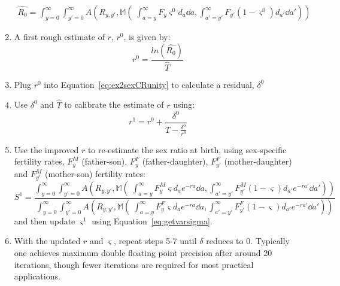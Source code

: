\begin{enumerate}
 \begin{equation}
 \begin{split}
 \widehat{R_0} = \int_{y=0}^\infty \int_{y'=0}^\infty
A\left(R_{y,y'},\mathbb{M}\left(\;\int_{a=y}^\infty F_y \varsigma^0 d_a \dd a,
\int _{a'=y'}^\infty F_{y'} (1-\varsigma^0) d_{a'} \dd a'\right)\right)
 \end{split}
 \end{equation}
  \item A first rough estimate of $r$, $r^0$, is given by:
   \begin{equation}
   r^0 = \frac{ln(\widehat{R_0})}{\widehat{T}}
   \end{equation}
  \item Plug $r^0$ into Equation~\ref{eq:ex2sexCRunity} to calculate a
  residual, $\delta^0$
  \item Use $\delta^0$ and $\widehat{T}$ to calibrate the estimate of $r$
  using:
  \begin{equation}
  r^{1} = r^0 + \frac{\delta^0}{\widehat{T} - \frac{\delta^0}{r^0}}
  \end{equation}
  \item Use the improved $r$ to re-estimate the sex ratio at birth, using
  sex-specific fertility rates, $F_y^M$ (father-son), $F_y^F$
  (father-daughter), $F_{y'}^F$ (mother-daughter) and $F_{y'}^M$ (mother-son)
  fertility rates:
  \begin{equation}
  S^1 = \frac{\int_{y=0}^\infty \int_{y'=0}^\infty
A\left(R_{y,y'},\mathbb{M}\left(\;\int_{a=y}^\infty F_y^M \varsigma d_ae^{-ra}
\dd a, \int _{a'=y'}^\infty F_{y'}^M (1-\varsigma) d_{a'}e^{-ra'} \dd
a'\right)\right)}{\int_{y=0}^\infty \int_{y'=0}^\infty A\left(R_{y,y'},
\mathbb{M}\left(\;\int_{a=y}^\infty F_y^F \varsigma d_a e^{-ra} \dd a, \int
_{a'=y'}^\infty F_{y'}^F (1-\varsigma) d_{a'}e^{-ra'} \dd a'\right)\right)}
  \end{equation}
  and then update $\varsigma^1$ using Equation~\eqref{eq:getvarsigma}.
  \item With the updated $r$ and $\varsigma$, repeat steps 5-7 until $\delta$
  reduces to 0. Typically one achieves maximum double floating point precision
  after around 20 iterations, though fewer iterations are required for
  most practical applications.
\end{enumerate}











